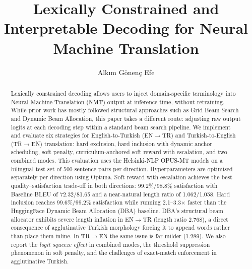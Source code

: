 \documentclass{CUP-JNL-NLP}
\begin{document}
\label{firstpage}


\title{Lexically Constrained and Interpretable Decoding for Neural Machine
Translation}

\begin{authgrp}
  \author{Alkım Gönenç Efe}
\end{authgrp}

\begin{abstract}
Lexically constrained decoding allows users to inject domain-specific terminology
into Neural Machine Translation (NMT) output at inference time, without retraining.
While prior work has mostly followed structural approaches such as Grid Beam Search
and Dynamic Beam Allocation, this paper takes a different route: adjusting raw output
logits at each decoding step within a standard beam search pipeline. We implement and
evaluate six strategies for English-to-Turkish (EN$\rightarrow$TR) and
Turkish-to-English (TR$\rightarrow$EN) translation: hard exclusion, hard inclusion
with dynamic anchor scheduling, soft penalty, curriculum-anchored soft reward with
escalation, and two combined modes. This evaluation uses the Helsinki-NLP OPUS-MT
models on a bilingual test set of 500 sentence pairs per direction. Hyperparameters
are optimised separately per direction using Optuna. Soft reward with escalation
achieves the best quality--satisfaction trade-off in both directions: 99.2\%/98.8\%
satisfaction with Baseline BLEU of 72.32/81.65 and a near-natural length ratio of
1.062/1.058. Hard inclusion reaches 99.6\%/99.2\% satisfaction while running
2.1--3.3$\times$ faster than the HuggingFace Dynamic Beam Allocation (DBA) baseline.
DBA's structural beam allocator exhibits severe length inflation in EN$\rightarrow$TR
(length ratio 2.768), a direct consequence of agglutinative Turkish morphology
forcing it to append words rather than place them inline. In TR$\rightarrow$EN the
same issue is far milder (1.289). We also report the \emph{logit squeeze effect} in
combined modes, the threshold suppression phenomenon in soft penalty, and the
challenges of exact-match enforcement in agglutinative Turkish.
\end{abstract}

\maketitle
\end{document}
